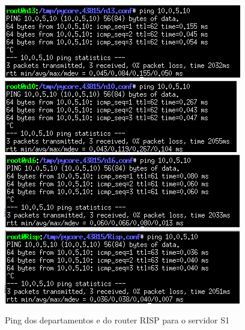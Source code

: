 \documentclass[11pt]{article}
\begin{document}
\begin{figure}[hbt!]
        \includegraphics[width=\linewidth]{images/parte2/depB_2.png}
        \centering
        \captionsetup{Departamento B}
    \endminipage\hfill
        \includegraphics[width=\linewidth]{images/parte2/depC_2.png}
        \centering
        \captionsetup{Departamento C}
    \endminipage
    \vspace{0.2cm}
        \includegraphics[width=\linewidth]{images/parte2/depD_2.png}
        \centering
        \captionsetup{Departamento D}
    \endminipage\hfill
        \includegraphics[width=\linewidth]{images/parte2/Risp_2.png}
        \centering
        \captionsetup{Router RISP}
    \endminipage
    \caption{Ping dos departamentos e do router RISP para o servidor S1}
\end{figure}
\end{document}
